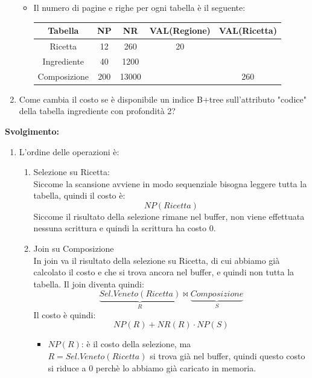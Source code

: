 \documentclass[a4paper,twoside]{article}
\begin{document}
\begin{exercise}
\begin{enumerate}
\begin{itemize}
        \item Il numero di pagine e righe per ogni tabella è il seguente:
          \begin{table}[H]
            \centering
            \begin{tabular}{|c|c|c|c|c|}
              \hline
              Tabella & NP & NR & VAL(Regione) & VAL(Ricetta) \\
              \hline
              Ricetta & 12 & 260 & 20 & \\
              Ingrediente & 40 & 1200 &  &  \\
              Composizione & 200 & 13000 &  & 260 \\
              \hline
            \end{tabular}
          \end{table}
      \end{itemize}

    \item Come cambia il costo se è disponibile un indice B+tree
      sull'attributo "codice" della tabella ingrediente con profondità 2?
  \end{enumerate}


  \vspace{1em}
  \noindent
  \textbf{Svolgimento:}
  \begin{enumerate}
    \item L'ordine delle operazioni è:
      \begin{enumerate}
        \item Selezione su Ricetta:\\
          Siccome la scansione avviene in modo sequenziale bisogna leggere tutta
          la tabella, quindi il costo è:
          \[
            NP(Ricetta)
          \] 
          Siccome il risultato della selezione rimane nel buffer, non viene
          effettuata nessuna scrittura e quindi la scrittura ha costo 0.

        \item Join su Composizione\\
          In join va il risultato della selezione su Ricetta, di cui abbiamo
          già calcolato il costo e che si trova ancora nel buffer, e quindi
          non tutta la tabella. Il join diventa quindi:
          \[
            \underbrace{Sel.Veneto(Ricetta)}_{R}
            \bowtie
            \underbrace{Composizione}_{S}
          \] 
          Il costo è quindi:
          \[
            NP(R) + NR(R) \cdot NP(S)
          \] 
          \begin{itemize}
            \item \( NP(R) \): è il costo della selezione, ma \\
              \( R = Sel.Veneto(Ricetta) \) si trova già nel buffer, quindi
              questo costo si riduce a 0 perchè lo abbiamo già caricato in memoria.


\end{itemize}
\end{enumerate}
\end{enumerate}
\end{exercise}
\end{document}
